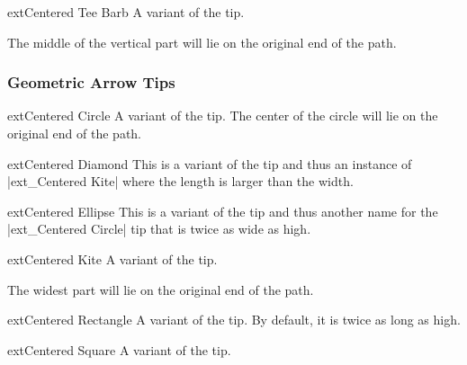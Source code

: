 \begin{multicols}{2}
\begin{arrowtipsimple}{ext\textunderscore Centered Tee Barb}\tipcompat
    A variant of the  tip.
    
    The middle of the vertical part will lie on the original end of the path.
\end{arrowtipsimple}

\subsubsection{Geometric Arrow Tips}
\begin{arrowtipsimple}{ext\textunderscore Centered Circle}\tipcompat
    A variant of the  tip.
    The center of the circle will lie on the original end of the path.
\end{arrowtipsimple}

\begin{arrowtipsimple}{ext\textunderscore Centered Diamond}\tipcompat
    This is a variant of the  tip and
    thus an instance of |ext_Centered Kite| where the length is larger than the width.
\end{arrowtipsimple}

\begin{arrowtipsimple}{ext\textunderscore Centered Ellipse}\tipcompat
    This is a variant of the  tip
    and thus another name for the |ext_Centered Circle| tip
    that is twice as wide as high.
\end{arrowtipsimple}

\begin{arrowtipsimple}{ext\textunderscore Centered Kite}\tipcompat
    A variant of the  tip.
    
    The widest part will lie on the original end of the path.
\end{arrowtipsimple}

\begin{arrowtipsimple}{ext\textunderscore Centered Rectangle}\tipcompat
    A variant of the  tip.
    By default, it is twice as long as high.
\end{arrowtipsimple}

\begin{arrowtipsimple}{ext\textunderscore Centered Square}\tipcompat
    A variant of the  tip.
\end{arrowtipsimple}


\end{multicols}
